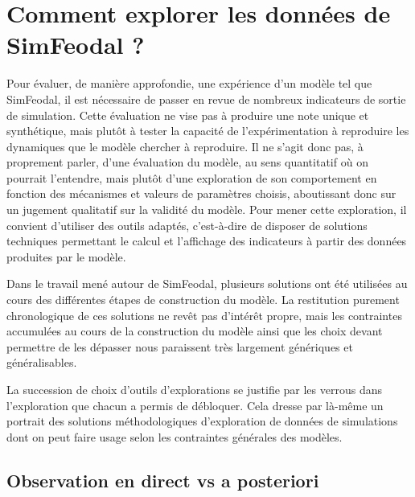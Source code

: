 \clearpage
\section[Comment explorer les données de SimFeodal ?]{Comment explorer les données de SimFeodal ?%
}\label{sec:explorer-sorties-simfeodal}

	Pour évaluer, de manière approfondie, une expérience d'un modèle tel que SimFeodal, il est nécessaire de passer en revue de nombreux indicateurs de sortie de simulation.
	Cette évaluation ne vise pas à produire une \og note\fg{} unique et synthétique, mais plutôt à tester la capacité de l'expérimentation à reproduire les dynamiques que le modèle chercher à reproduire.
	Il ne s'agit donc pas, à proprement parler, d'une évaluation du modèle, au sens quantitatif où on pourrait l'entendre, mais plutôt d'une exploration de son comportement en fonction des mécanismes et valeurs de paramètres choisis, aboutissant donc sur un jugement qualitatif sur la validité du modèle.
	Pour mener cette exploration, il convient d'utiliser des outils adaptés, c'est-à-dire de disposer de solutions techniques permettant le calcul et l'affichage des indicateurs à partir des données produites par le modèle.
	
	Dans le travail mené autour de SimFeodal, plusieurs solutions ont été utilisées au cours des différentes étapes de construction du modèle.
	La restitution purement chronologique de ces solutions ne revêt pas d'intérêt propre, mais les contraintes accumulées au cours de la construction du modèle ainsi que les choix devant permettre de les dépasser nous paraissent très largement génériques et généralisables.
	
	La succession de choix d'outils d'explorations se justifie par les verrous dans l'exploration que chacun a permis de débloquer.
	Cela dresse par là-même un portrait des solutions méthodologiques d'exploration de données de simulations dont on peut faire usage selon les contraintes générales des modèles.

	\subsection{Observation en direct vs a posteriori}\label{subsec:observation-a-posteriori}


